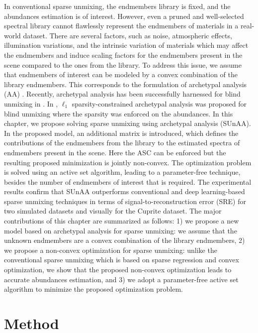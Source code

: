 In conventional sparse unmixing, the endmembers library is fixed, and the abundances estimation is of interest. However, even a pruned and well-selected spectral library cannot flawlessly represent the endmembers of materials in a real-world dataset. There are several factors, such as noise, atmospheric effects, illumination variations, and the intrinsic variation of materials which may affect the endmembers and induce scaling factors for the endmembers present in the scene compared to the ones from the library. To address this issue, we assume that endmembers of interest can be modeled by a convex combination of the library endmembers. This corresponds to the formulation of archetypal analysis (AA) \cite{cutler_archetypal_1994}. Recently, archetypal analysis  has been successfully harnessed for blind unmixing in \cite{zouaoui_entropic_2023}. In \cite{xu_l1_2022}, $\ell_1$ sparsity-constrained archetypal analysis was proposed for blind unmixing where the sparsity was enforced on the abundances. In this chapter, we propose solving sparse unmixing using archetypal analysis (SUnAA). In the proposed model, an additional matrix is introduced, which defines the contributions of the endmembers from the library to the estimated spectra of endmembers present in the scene. Here the ASC can be enforced but the resulting proposed minimization is jointly non-convex. The optimization problem is solved using an active set algorithm, leading to a parameter-free technique, besides the number of endmembers of interest that is required. The experimental results confirm that SUnAA outperforms conventional and deep learning-based sparse unmixing techniques in terms of signal-to-reconstruction error (SRE) for two simulated datasets and visually for the Cuprite dataset. The major contributions of this chapter are summarized as follows: 1) we propose a new model based on archetypal analysis for sparse unmixing: we assume that the unknown endmembers are a convex combination of the library endmembers, 2) we propose a non-convex optimization for sparse unmixing: unlike the conventional sparse unmixing which is based on sparse regression and convex optimization, we show that the proposed non-convex optimization leads to accurate abundances estimation, and 3) we adopt a parameter-free active set algorithm to minimize the proposed optimization problem.

\section{Method}
\label{sec:model}

